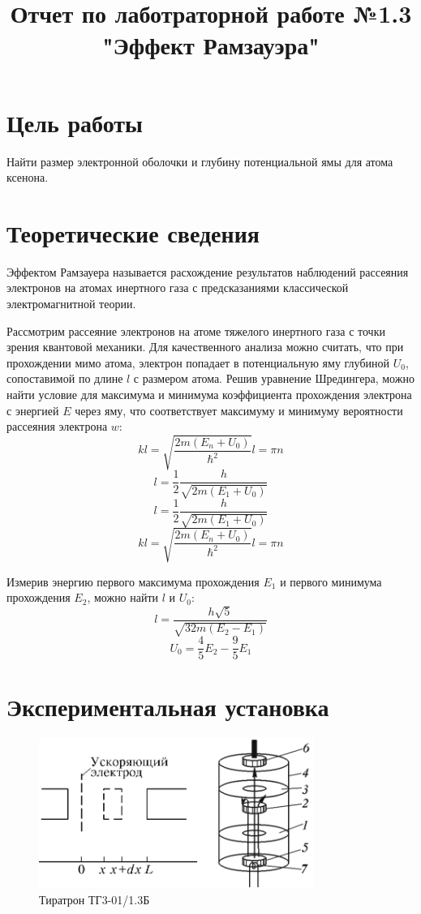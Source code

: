 \documentclass[12pt]{article}%
\date{}%
\title{Отчет по лаботраторной работе №1.3 "Эффект Рамзауэра"}%
\begin{document}
%
\normalsize%
\maketitle%
\section{Цель работы}%
\label{sec:}%
Найти размер электронной оболочки и глубину потенциальной ямы для атома ксенона.

%
\section{Теоретические сведения}%
\label{sec:}%

        Эффектом Рамзауера называется расхождение результатов наблюдений
        рассеяния электронов на атомах инертного газа с предсказаниями
        классической электромагнитной теории.

        Рассмотрим рассеяние электронов на атоме тяжелого инертного газа с точки
        зрения квантовой механики.
        Для качественного анализа можно считать,
        что при прохождении мимо атома, электрон попадает в
        потенциальную яму глубиной $U_0$, сопоставимой по длине $l$ с размером
        атома.
        Решив уравнение Шредингера, можно найти условие для максимума
        и минимума коэффициента прохождения электрона с энергией $E$ через яму,
        что соответствует максимуму и минимуму вероятности рассеяния электрона $w$:
\[%
k l =  \sqrt{ \frac{2m (E_n + U_0)}{\hbar^2} } l = \pi n%
\]%
\[%
l = \frac{1}{2} \frac{h}{\sqrt{2m \left( E_1 + U_0 \right)}}%
\]%
\[%
l=\frac{1}{2} \frac{h}{\sqrt{2m \left( E_1 + U_0 \right)}}%
\]%
\[%
k l =  \sqrt{ \frac{2m (E_n + U_0)}{\hbar^2} } l = \pi n%
\]%

        Измерив энергию первого максимума прохождения $E_1$ и первого минимума
        прохождения $E_2$, можно найти $l$ и $U_0$:
\[%
l=\frac{h \sqrt{5}}{\sqrt{32 m (E_2 - E_1)}}%
\]%
\[%
U_0=\frac{4}{5} E_2 - \frac{9}{5} E_1%
\]

%
\section{Экспериментальная установка}%
\label{sec:}%


\begin{figure}[h!]%
\centering%
\includegraphics[width=0.8\textwidth]{sys.png}%
\caption{Тиратрон ТГ3{-}01/1.3Б}%
\end{figure}
\end{document}
